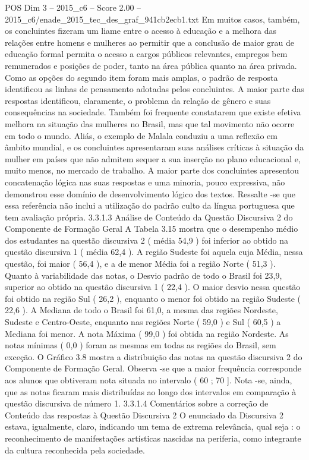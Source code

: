 \begin{textsample}{POS Dim 3 – 2015\_c6 – Score 2.00 – 2015\_c6/enade\_2015\_tec\_des\_graf\_941cb2ecb1.txt}
Em muitos casos, também, os concluintes fizeram um liame entre o acesso à educação e a melhora das relações entre homens e mulheres ao permitir que a conclusão de maior grau de educação formal permita o acesso a cargos públicos relevantes, empregos bem remunerados e posições de poder, tanto na área pública quanto na área privada.
Como as opções do segundo item foram mais amplas, o padrão de resposta identificou as linhas de pensamento adotadas pelos concluintes.
A maior parte das respostas identificou, claramente, o problema da relação de gênero e suas consequências na sociedade.
Também foi frequente constatarem que existe efetiva melhora na situação das mulheres no Brasil, mas que tal movimento não ocorre em todo o mundo.
Aliás, o exemplo de Malala conduziu a uma reflexão em âmbito mundial, e os concluintes apresentaram suas análises críticas à situação da mulher em países que não admitem sequer a sua inserção no plano educacional e, muito menos, no mercado de trabalho.
A maior parte dos concluintes apresentou concatenação lógica nas suas respostas e uma minoria, pouco expressiva, não demonstrou esse domínio de desenvolvimento lógico dos textos.
Ressalte -se que essa referência não inclui a utilização do padrão culto da língua portuguesa que tem avaliação própria. 3.3.1.3 Análise de Conteúdo da Questão Discursiva 2 do Componente de Formação Geral A Tabela 3.15 mostra que o desempenho médio dos estudantes na questão discursiva 2 ( média 54,9 ) foi inferior ao obtido na questão discursiva 1 ( média 62,4 ).
A região Sudeste foi aquela cuja Média, nessa questão, foi maior ( 56,4 ), e a de menor Média foi a região Norte ( 51,3 ).
Quanto à variabilidade das notas, o Desvio padrão de todo o Brasil foi 23,9, superior ao obtido na questão discursiva 1 ( 22,4 ).
O maior desvio nessa questão foi obtido na região Sul ( 26,2 ), enquanto o menor foi obtido na região Sudeste ( 22,6 ).
A Mediana de todo o Brasil foi 61,0, a mesma das regiões Nordeste, Sudeste e Centro-Oeste, enquanto nas regiões Norte ( 59,0 ) e Sul ( 60,5 ) a Mediana foi menor.
A nota Máxima ( 99,0 ) foi obtida na região Nordeste.
As notas mínimas ( 0,0 ) foram as mesmas em todas as regiões do Brasil, sem exceção.
O Gráfico 3.8 mostra a distribuição das notas na questão discursiva 2 do Componente de Formação Geral.
Observa -se que a maior frequência corresponde aos alunos que obtiveram nota situada no intervalo ( 60 ; 70 ].
Nota -se, ainda, que as notas ficaram mais distribuídas ao longo dos intervalos em comparação à questão discursiva de número 1. 3.3.1.4 Comentários sobre a correção de Conteúdo das respostas à Questão Discursiva 2 O enunciado da Discursiva 2 estava, igualmente, claro, indicando um tema de extrema relevância, qual seja : o reconhecimento de manifestações artísticas nascidas na periferia, como integrante da cultura reconhecida pela sociedade.

\end{textsample}
